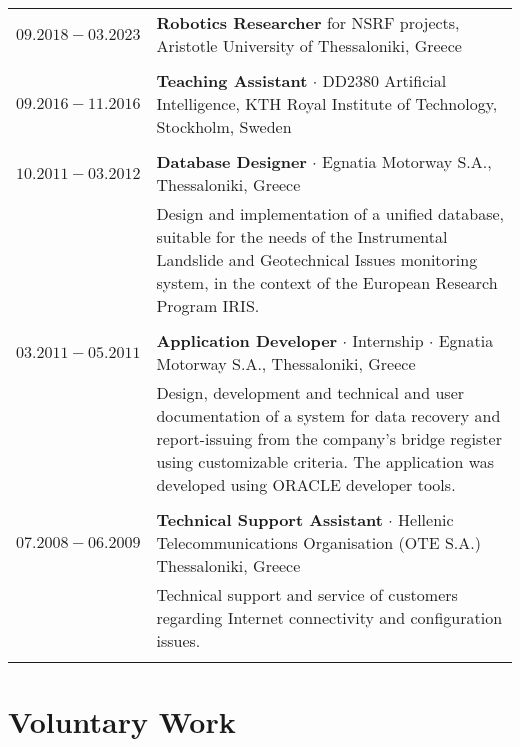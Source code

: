 \documentclass[a4paper,10pt,twoside]{article}
\begin{document}
\begin{tabular}{rp{11cm}}
$09.2018 - 03.2023$ & \textbf{Robotics Researcher} for NSRF projects, Aristotle University of Thessaloniki, Greece\\
&\\
$09.2016 - 11.2016$ & \textbf{Teaching Assistant} $\cdot$ DD2380 Artificial Intelligence, KTH Royal Institute of Technology, Stockholm, Sweden\\
&\\

$10.2011 - 03.2012$ & \textbf{Database Designer}  $\cdot$ Egnatia Motorway S.A., Thessaloniki, Greece \\
& \small{Design and implementation of a unified database, suitable for the needs of the
Instrumental Landslide and Geotechnical Issues
monitoring system, in the context of the European Research Program IRIS.
}\\
\multicolumn{2}{c}{} \\


$03.2011 - 05.2011$ & \textbf{Application Developer}  $\cdot$ Internship $\cdot$ Egnatia Motorway S.A., Thessaloniki, Greece\\
& \small{Design, development and technical and user documentation of a system for data
recovery and report-issuing from the company's bridge register using
customizable criteria. The application was developed using ORACLE developer tools.
}\\
\multicolumn{2}{c}{} \\


$07.2008 - 06.2009$ & \textbf{Technical Support Assistant}  $\cdot$ Hellenic Telecommunications
Organisation (OTE S.A.) Thessaloniki, Greece\\
& \small{Technical support and service of customers regarding Internet connectivity and configuration
issues.}\\
&\\
\end{tabular}



\section{Voluntary Work}
\end{document}

